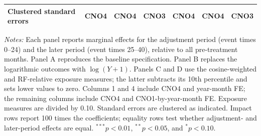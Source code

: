 \begin{landscape}
\begin{table}[H]
\begin{threeparttable}
\begin{tabular}{lcccccc}
Clustered standard errors & CNO4 & CNO4 & CNO3 & CNO4 & CNO4 & CNO3 \\
\bottomrule
\end{tabular}
\begin{tablenotes}[flushleft]
\tiny
\item \emph{Notes:} Each panel reports marginal effects for the adjustment period (event times 0--24) and the later period (event times 25--40), relative to all pre-treatment months. Panel A reproduces the baseline specification. Panel B replaces the logarithmic outcomes with $\log(Y+1)$. Panels C and D use the cosine-weighted and RF-relative exposure measures; the latter subtracts its 10th percentile and sets lower values to zero. Columns 1 and 4 include CNO4 and year-month FE; the remaining columns include CNO4 and CNO1-by-year-month FE. Exposure measures are divided by 0.10. Standard errors are clustered as indicated. Impact rows report 100 times the coefficients; equality rows test whether adjustment- and later-period effects are equal. $^{***}p<0.01$, $^{**}p<0.05$, and $^{*}p<0.10$.
\end{tablenotes}
\end{threeparttable}
\end{table}
\end{landscape}
